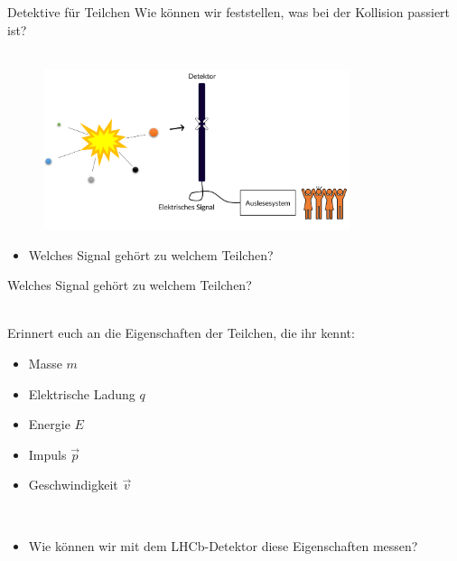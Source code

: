 \begin{frame}{Detektive für Teilchen}%
Wie können wir feststellen, was bei der Kollision passiert ist?\\
\ \\
    \begin{figure}[h]
       
        \includegraphics[width=0.8\textwidth]{Figures Introductory Lecture/LHCb Detector/Detectorsignal_DE.png}
        \label{fig:Detektorsignal}
    \end{figure}

    \begin{itemize}
        \item<2->[\ding{55}] Welches Signal gehört zu welchem Teilchen?
    \end{itemize}
    
\end{frame}
\begin{frame}{Welches Signal gehört zu welchem Teilchen?}
    

\ \\
Erinnert euch an die Eigenschaften der Teilchen, die ihr kennt: \\
\begin{itemize}
    \item<2-> Masse \hfill $m$ \hspace{6cm}\,
    \item<2-> Elektrische Ladung  \hfill $q$ \hspace{6cm}\,
    \item<2-> Energie  \hfill $E$ \hspace{6cm}\,
    \item<2-> Impuls  \hfill $\vec{p} $ \hspace{6cm}\,
    \item<2-> Geschwindigkeit  \hfill $\vec{v}$ \hspace{6cm}\,
 
\ \\
    \item<3->[\ding{220}] Wie können wir mit dem LHCb-Detektor diese Eigenschaften messen?

    
\end{itemize}
\end{frame}
